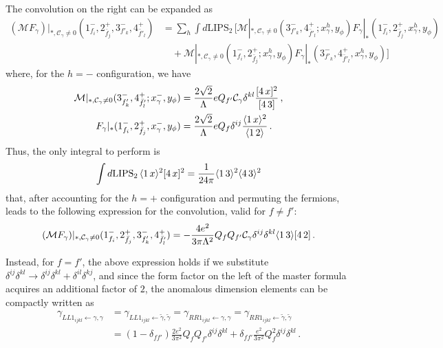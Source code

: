 The convolution on the right can be expanded as
\begin{align}
    (\mathcal M F_\gamma)|_{*,\mathcal C_\gamma \neq 0} (1^-_{f_i},2^+_{\bar f_j}, 3^-_{f'_k},4^+_{\bar f'_l}) &= \sum_h \int d \text{LIPS}_2 \,\bigg[ \mathcal M|_{*,\mathcal C_\gamma \neq 0}(3^-_{f'_k},4^+_{\bar f'_l}; x_{\gamma}^h , y_\phi) F_{\gamma}|_*(1^-_{f_i},2^+_{\bar f_j},x_{\gamma}^h , y_\phi) \nonumber \\
    &\quad +
    \mathcal M|_{*,\mathcal C_\gamma \neq 0}(1^-_{f_i},2^+_{\bar f_j}; x_{\gamma}^h , y_\phi) F_{\gamma}|_*(3^-_{f'_k},4^+_{\bar f'_l},x_{\gamma}^h , y_\phi) 
    \bigg]
\end{align}
where, for the $h=-$ configuration, we have
\begin{align}
    \mathcal M|_{*,\mathcal C_\gamma \neq 0}(3^-_{f'_k},4^+_{\bar f'_l}; x_{\gamma}^- , y_\phi) &= \frac{2\sqrt{2}}{\Lambda}e Q_{f'}\mathcal C_\gamma\delta^{kl} \frac{\lbrack 4\, x \rbrack^2}{\lbrack 4\, 3 \rbrack}\,,\\
    F_{\gamma}|_*(1^-_{f_i},2^+_{\bar f_j},x_{\gamma}^- , y_\phi) &= \frac{2\sqrt{2}}{\Lambda}e Q_{f}\delta^{ij} \frac{\langle1\, x \rangle^2}{\langle1\, 2 \rangle}  \,.
\end{align}
Thus, the only integral to perform is 
\begin{equation}
    \int d \text{LIPS}_2 \, \langle1\, x \rangle^2 \lbrack 4\, x \rbrack^2 = \frac{1}{24\pi}\langle1\, 3 \rangle^2 \langle4\, 3 \rangle^2
\end{equation}
that, after accounting for the $h=+$ configuration and permuting the fermions, leads to the following expression for the convolution, valid for $f \neq f'$:
\begin{align}
    (\mathcal M F_\gamma)|_{*,\mathcal C_\gamma \neq 0} (1^-_{f_i},2^+_{\bar f_j}, 3^-_{f'_k},4^+_{\bar f'_l}) = - \frac{4e^2}{3\pi \Lambda^2}Q_f Q_{f'} \mathcal C_\gamma \delta^{ij} \delta^{kl} \langle1\, 3 \rangle\lbrack 4\, 2 \rbrack\,.
\end{align}

Instead, for $f = f'$, the above expression holds if we substitute $\delta^{ij} \delta^{kl} \to \delta^{ij} \delta^{kl} + \delta^{il} \delta^{kj}$, and since the form factor on the left of the master formula acquires an additional factor of $2$, the anomalous dimension elements can be compactly written as
\begin{align}
    \gamma_{LL1_{ijkl} \leftarrow \gamma,\gamma } &= 
    \gamma_{LL1_{ijkl} \leftarrow \tilde\gamma, \tilde\gamma} = 
    \gamma_{RR1_{ijkl} \leftarrow \gamma,\gamma } =
    \gamma_{RR1_{ijkl} \leftarrow \tilde\gamma, \tilde\gamma}\nonumber \\
    &= (1-\delta_{ff'})\frac{2e^2}{3\pi^2 } Q_f Q_{f'}  \delta^{ij} \delta^{kl} +   \delta_{ff'}\frac{e^2}{3\pi^2 } Q_f^2  \delta^{ij} \delta^{kl}\,.\label{eq:LL1<-gammagamma}
\end{align}

